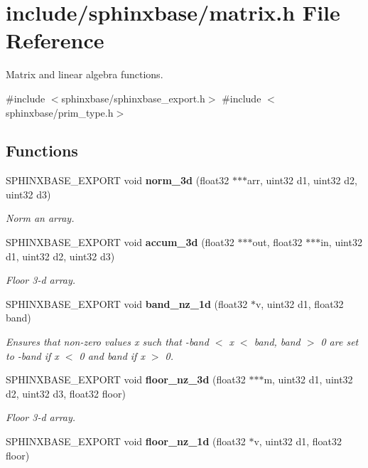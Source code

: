 \section{include/sphinxbase/matrix.h \-File \-Reference}
\label{matrix_8h}


\-Matrix and linear algebra functions.  


{\ttfamily \#include $<$sphinxbase/sphinxbase\-\_\-export.\-h$>$}\*
{\ttfamily \#include $<$sphinxbase/prim\-\_\-type.\-h$>$}\*
\subsection*{\-Functions}
\begin{DoxyCompactItemize}
\item 
\-S\-P\-H\-I\-N\-X\-B\-A\-S\-E\-\_\-\-E\-X\-P\-O\-R\-T void {\bf norm\-\_\-3d} (float32 $\ast$$\ast$$\ast$arr, uint32 d1, uint32 d2, uint32 d3)
\begin{DoxyCompactList}\small\item\em \-Norm an array. \end{DoxyCompactList}\item 
\-S\-P\-H\-I\-N\-X\-B\-A\-S\-E\-\_\-\-E\-X\-P\-O\-R\-T void {\bf accum\-\_\-3d} (float32 $\ast$$\ast$$\ast$out, float32 $\ast$$\ast$$\ast$in, uint32 d1, uint32 d2, uint32 d3)
\begin{DoxyCompactList}\small\item\em \-Floor 3-\/d array. \end{DoxyCompactList}\item 
\-S\-P\-H\-I\-N\-X\-B\-A\-S\-E\-\_\-\-E\-X\-P\-O\-R\-T void {\bf band\-\_\-nz\-\_\-1d} (float32 $\ast$v, uint32 d1, float32 band)
\begin{DoxyCompactList}\small\item\em \-Ensures that non-\/zero values x such that -\/band $<$ x $<$ band, band $>$ 0 are set to -\/band if x $<$ 0 and band if x $>$ 0. \end{DoxyCompactList}\item 
\-S\-P\-H\-I\-N\-X\-B\-A\-S\-E\-\_\-\-E\-X\-P\-O\-R\-T void {\bf floor\-\_\-nz\-\_\-3d} (float32 $\ast$$\ast$$\ast$m, uint32 d1, uint32 d2, uint32 d3, float32 floor)
\begin{DoxyCompactList}\small\item\em \-Floor 3-\/d array. \end{DoxyCompactList}\item 
\-S\-P\-H\-I\-N\-X\-B\-A\-S\-E\-\_\-\-E\-X\-P\-O\-R\-T void {\bf floor\-\_\-nz\-\_\-1d} (float32 $\ast$v, uint32 d1, float32 floor)

\end{DoxyCompactItemize}
